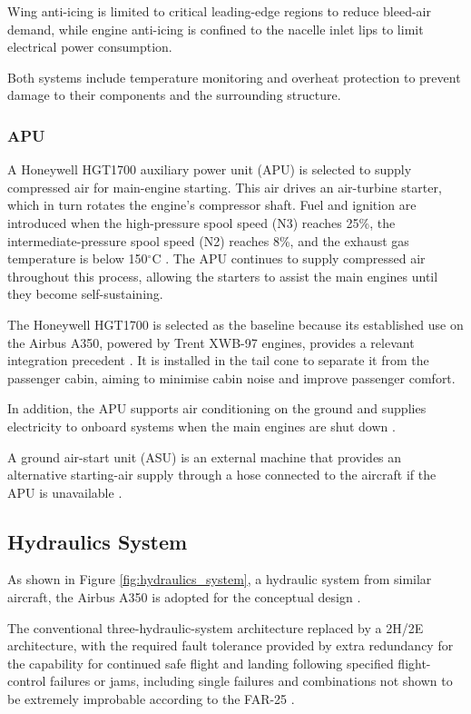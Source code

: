 Wing anti-icing is limited to critical leading-edge regions to reduce bleed-air demand, while engine anti-icing is confined to the nacelle inlet lips to limit electrical power consumption. 

Both systems include temperature monitoring and overheat protection to prevent damage to their components and the surrounding structure.
\subsubsection{APU}
A Honeywell HGT1700 auxiliary power unit (APU) is selected to supply compressed air for main-engine starting. This air drives an air-turbine starter, which in turn rotates the engine’s compressor shaft. Fuel and ignition are introduced when the high-pressure
spool speed (N3) reaches 25\%, the intermediate-pressure
spool speed (N2) reaches 8\%, and the exhaust gas
temperature is below 150$^\circ$C \cite{A350-1000}. The APU continues to supply compressed air throughout this process, allowing the starters to assist the main engines until they become self-sustaining.

The Honeywell HGT1700 is selected as the baseline because its established use on the Airbus A350, powered by Trent XWB-97 engines, provides a relevant integration precedent \cite{Honeywell_APU,A350-1000}. It is installed in the tail cone to separate it from the passenger cabin, aiming to minimise cabin noise and improve passenger comfort.

In addition, the APU supports air conditioning on the
ground and supplies electricity to onboard systems when
the main engines are shut down \cite{Honeywell_APU}.

A ground air-start unit (ASU) is an external machine that provides an alternative starting-air supply through a hose connected to the aircraft if the APU is unavailable \cite{FAA_EngineStarting}.

\subsection{Hydraulics System}
As shown in Figure \ref{fig:hydraulics_system}, a hydraulic system from similar aircraft, the Airbus A350 \cite{A350-1000} is adopted for the conceptual design \cite{Raymer Book}. 

The conventional three-hydraulic-system architecture replaced by a 2H/2E architecture, with the required fault tolerance provided by extra redundancy for the capability for continued safe flight and landing following specified flight-control failures or jams, including single failures and combinations not shown to be extremely improbable according to the FAR-25 \cite{FAR 25}. 

